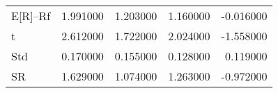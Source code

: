 \begin{tabular}{lrrrr}
\toprule
\midrule
E[R]--Rf & 1.991000 & 1.203000 & 1.160000 & -0.016000 \\
t & 2.612000 & 1.722000 & 2.024000 & -1.558000 \\
Std & 0.170000 & 0.155000 & 0.128000 & 0.119000 \\
SR & 1.629000 & 1.074000 & 1.263000 & -0.972000 \\
\bottomrule
\end{tabular}
